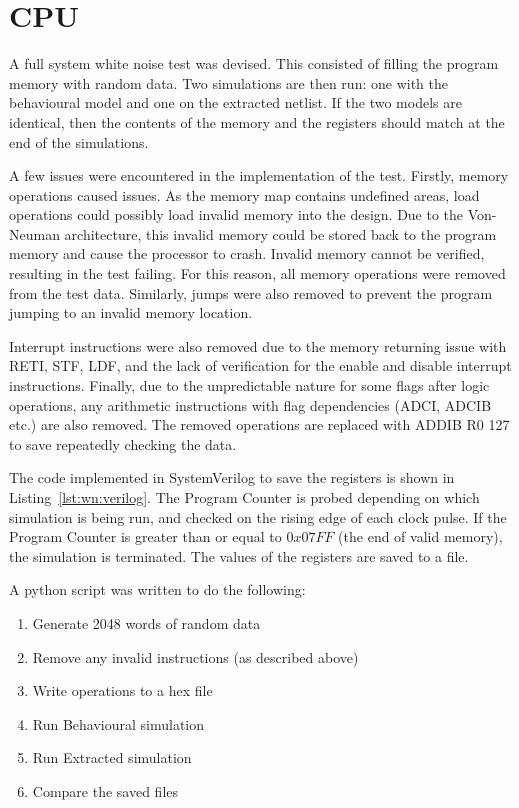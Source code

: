 
\section{CPU}


A full system white noise test was devised. 
This consisted of filling the program memory with random data. 
Two simulations are then run: one with the behavioural model and one on the extracted netlist. 
If the two models are identical, then the contents of the memory and the registers should match at the end of the simulations.

A few issues were encountered in the implementation of the test.
Firstly, memory operations caused issues. 
As the memory map contains undefined areas, load operations could possibly load invalid memory into the design.
Due to the Von-Neuman architecture, this invalid memory could be stored back to the program memory and cause the processor to crash. 
Invalid memory cannot be verified, resulting in the test failing. 
For this reason, all memory operations were removed from the test data.
Similarly, jumps were also removed to prevent the program jumping to an invalid memory location. 

Interrupt instructions were also removed due to the memory returning issue with RETI, STF, LDF, and the lack of verification for the enable and disable interrupt instructions. 
Finally, due to the unpredictable nature for some flags after logic operations, any arithmetic instructions with flag dependencies (ADCI, ADCIB etc.) are also removed. 
The removed operations are replaced with ADDIB R0 127 to save repeatedly checking the data. 

The code implemented in SystemVerilog to save the registers is shown in Listing~\ref{lst:wn:verilog}.
The Program Counter is probed depending on which simulation is being run, and checked on the rising edge of each clock pulse. %
If the Program Counter is greater than or equal to $0x07FF$ (the end of valid memory), the simulation is terminated.
The values of the registers are saved to a file. 

\noindent A python script was written to do the following:
\begin{enumerate}
\item Generate 2048 words of random data
\item Remove any invalid instructions (as described above)
\item Write operations to a hex file
\item Run Behavioural simulation
\item Run Extracted simulation
\item Compare the saved files
\end{enumerate}

